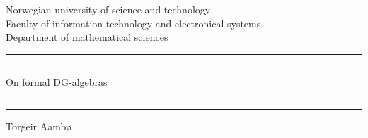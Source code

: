 \begin{titlingpage}



    \vspace*{5cm}
    \begin{center}
	Norwegian university of science and 		technology \\
	Faculty of information technology and 		electronical systems \\
	Department of mathematical sciences 
	\end{center}
    \rule[-11pt]{\textwidth}{1pt}
    \rule{\textwidth}{0.5pt}
    
    \begin{center}
    \Huge On formal DG-algebras 
    \end{center}
    
    \rule{\textwidth}{0.5pt}
    \rule[10.1pt]{\textwidth}{1pt}
    
    
    \begin{center}
    Torgeir Aambø
    \end{center}
    
    
    
    \vspace{\fill}
    


\end{titlingpage}